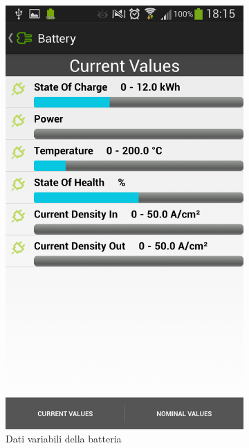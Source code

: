 \begin{figure}
	\centering
	\begin{subfigure}{0.45\textwidth}
		\includegraphics[width=\textwidth]{assets/mobile-app-battery-var.png}
		\caption{Dati variabili della batteria}
		\label{fig:battery-var}
	\end{subfigure}
	\begin{subfigure}{0.45\textwidth}

\end{subfigure}
\end{figure}
